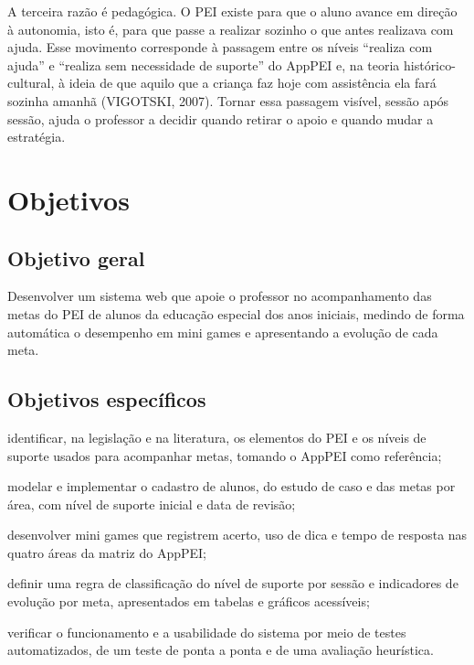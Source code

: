 A terceira razão é pedagógica. O PEI existe para que o aluno avance em direção à autonomia, isto é, para que passe a realizar sozinho o que antes realizava com ajuda. Esse movimento corresponde à passagem entre os níveis “realiza com ajuda” e “realiza sem necessidade de suporte” do AppPEI e, na teoria histórico-cultural, à ideia de que aquilo que a criança faz hoje com assistência ela fará sozinha amanhã (VIGOTSKI, 2007). Tornar essa passagem visível, sessão após sessão, ajuda o professor a decidir quando retirar o apoio e quando mudar a estratégia.

\section{Objetivos}\label{sec:1.2}

\subsection{Objetivo geral}\label{sec:1.2.1}

Desenvolver um sistema web que apoie o professor no acompanhamento das metas do PEI de alunos da educação especial dos anos iniciais, medindo de forma automática o desempenho em mini games e apresentando a evolução de cada meta.

\subsection{Objetivos específicos}\label{sec:1.2.2}

\begin{alineasIFTO}
  \item identificar, na legislação e na literatura, os elementos do PEI e os níveis de suporte usados para acompanhar metas, tomando o AppPEI como referência;
  \item modelar e implementar o cadastro de alunos, do estudo de caso e das metas por área, com nível de suporte inicial e data de revisão;
  \item desenvolver mini games que registrem acerto, uso de dica e tempo de resposta nas quatro áreas da matriz do AppPEI;
  \item definir uma regra de classificação do nível de suporte por sessão e indicadores de evolução por meta, apresentados em tabelas e gráficos acessíveis;
  \item verificar o funcionamento e a usabilidade do sistema por meio de testes automatizados, de um teste de ponta a ponta e de uma avaliação heurística.
\end{alineasIFTO}

